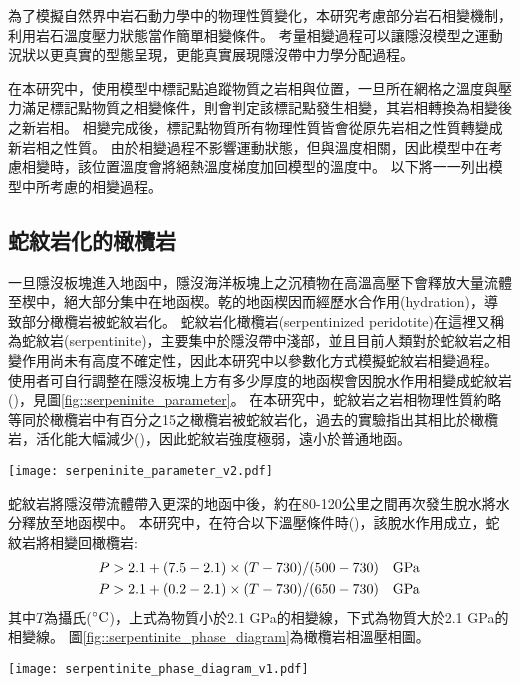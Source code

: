 為了模擬自然界中岩石動力學中的物理性質變化，本研究考慮部分岩石相變機制，利用岩石溫度壓力狀態當作簡單相變條件。
考量相變過程可以讓隱沒模型之運動況狀以更真實的型態呈現，更能真實展現隱沒帶中力學分配過程。

在本研究中，使用模型中標記點追蹤物質之岩相與位置，一旦所在網格之溫度與壓力滿足標記點物質之相變條件，則會判定該標記點發生相變，其岩相轉換為相變後之新岩相。
相變完成後，標記點物質所有物理性質皆會從原先岩相之性質轉變成新岩相之性質。
由於相變過程不影響運動狀態，但與溫度相關，因此模型中在考慮相變時，該位置溫度會將絕熱溫度梯度加回模型的溫度中。
以下將一一列出模型中所考慮的相變過程。

\subsection{蛇紋岩化的橄欖岩}\label{蛇紋岩化的橄欖岩}
一旦隱沒板塊進入地函中，隱沒海洋板塊上之沉積物在高溫高壓下會釋放大量流體至楔中，絕大部分集中在地函楔。乾的地函楔因而經歷水合作用(hydration)，導致部分橄欖岩被蛇紋岩化。
蛇紋岩化橄欖岩(serpentinized peridotite)在這裡又稱為蛇紋岩(serpentinite)，主要集中於隱沒帶中淺部，並且目前人類對於蛇紋岩之相變作用尚未有高度不確定性，因此本研究中以參數化方式模擬蛇紋岩相變過程。
使用者可自行調整在隱沒板塊上方有多少厚度的地函楔會因脫水作用相變成蛇紋岩(\citealp{Tan2012})，見圖\ref{fig::serpeninite_parameter}。
在本研究中，蛇紋岩之岩相物理性質約略等同於橄欖岩中有百分之15之橄欖岩被蛇紋岩化，過去的實驗指出其相比於橄欖岩，活化能大幅減少(\citealp{hilairet2007high})，因此蛇紋岩強度極弱，遠小於普通地函。

\begin{figure*}[ht!]
    \centering
    \texttt{[image: serpeninite\_parameter\_v2.pdf]}
    \caption[蛇紋岩參數化示意圖]{蛇紋岩參數化示意圖。於模型隱沒板塊上，海洋地殼玄武岩與沉積物之上的地函會生成h公里厚的蛇紋岩，亦即假設玄武岩相變與沉積物相變的脫水作用會導致地函被蛇紋岩化。}
    \label{fig::serpeninite_parameter}
\end{figure*}

蛇紋岩將隱沒帶流體帶入更深的地函中後，約在80-120公里之間再次發生脫水將水分釋放至地函楔中。
本研究中，在符合以下溫壓條件時(\citealp{Ulmer1995})，該脫水作用成立，蛇紋岩將相變回橄欖岩:
\begin{align}
P > 2.1 + (7.5-2.1)\times (T-730)/(500-730) \quad {\rm GPa} \\
P > 2.1 + (0.2-2.1) \times (T-730)/(650-730) \quad {\rm GPa}
\end{align}
其中$T$為攝氏(${\rm ^\circ C}$)，上式為物質小於2.1 GPa的相變線，下式為物質大於2.1 GPa的相變線。
圖\ref{fig::serpentinite_phase_diagram}為橄欖岩相溫壓相圖。
\begin{figure*}[h!]
    \centering
    \texttt{[image: serpentinite\_phase\_diagram\_v1.pdf]}
    \caption[橄欖岩相圖，參考\citet{Ulmer1995}]{橄欖岩相圖。紫線代表蛇紋岩脫水回橄欖岩之相變圖，參考\citet{Ulmer1995}。綠線與黃線分別代表橄欖岩的乾固相線(dry solidus)與含水固相線(wet solidus)，摘自\citet{katz2003new}。另用灰線實線與虛線分別表示墨西哥參考模型之海洋岩石圈與大陸岩石圈地溫梯度。}
    \label{fig::serpentinite_phase_diagram}
\end{figure*}

